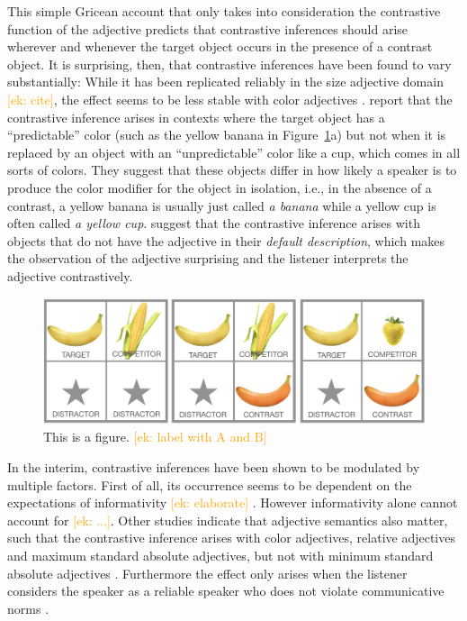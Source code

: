 \documentclass[10pt,letterpaper]{article}
\newcommand{\ek}[1]{\textcolor{Orange}{[ek: #1]}}
\begin{document}
This simple Gricean account that only takes into consideration the contrastive function of the adjective predicts that contrastive inferences should arise wherever and whenever the target object occurs in the presence of a contrast object. It is surprising, then, that contrastive inferences have been found to vary substantially: While it has been replicated reliably in the size adjective domain \ek{cite}, the effect seems to be less stable with color adjectives \cite{Sedivy:2003}.  report that the contrastive inference arises in contexts where the target object has a ``predictable'' color (such as the yellow banana in Figure~\ref{example-context}a) but not when it is replaced by an object with an ``unpredictable'' color like a cup, which comes in all sorts of colors.
They suggest that these objects differ in how likely a speaker is to produce the color modifier for the object in isolation, i.e., in the absence of a contrast, a yellow banana is usually just called \textit{a banana} while a yellow cup is often called \textit{a yellow cup}.  suggest that the contrastive inference arises with objects that do not have the adjective in their \emph{default description}, which makes the observation of the adjective surprising and the listener interprets the adjective contrastively. 

\begin{figure}
	\begin{center}
		\includegraphics[width=.475\textwidth]{graphs/example-context.pdf}
	\end{center}
\caption{This is a figure. \ek{label with A and B}} 
\label{example-context}
\end{figure}


In the interim, contrastive inferences have been shown to be modulated by multiple factors. First of all, its occurrence seems to be dependent on the expectations of informativity \ek{elaborate} \cite{Aparicio:2016, Aparicio:2018, Sedivy:2003}. However informativity alone cannot account for \ek{...}. Other studies indicate that adjective semantics also matter, such that the contrastive inference arises with color adjectives, relative adjectives and maximum standard absolute
adjectives, but not with minimum standard absolute adjectives \cite{Aparicio:2018}. Furthermore the effect only arises when the listener considers the speaker as a reliable speaker who does not violate communicative norms \cite{Grodner:2011}.
\end{document}
